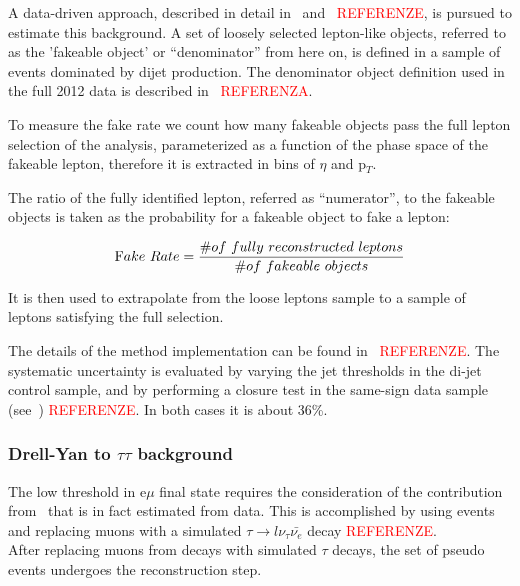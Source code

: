 A data-driven approach, described in detail in~\cite{AN-2010-261} and~\cite{AN-2010-397} \textcolor{red}{REFERENZE}, is pursued 
to estimate this background. A set of loosely selected lepton-like objects, referred to as the 
'fakeable object' or ``denominator'' from here on, is defined in a sample of events 
dominated by dijet production. The denominator object definition used in the full 2012
data is described in~\cite{AN-2012-378} \textcolor{red}{REFERENZA}.

To measure the fake rate we count how many fakeable objects pass the full lepton selection 
of the analysis, parameterized as a function of the phase space of the fakeable lepton, therefore 
it is extracted in bins of $\eta$ and p$_T$.


The ratio of the fully identified lepton, referred as ``numerator'', to the 
fakeable objects is taken as the probability for a fakeable object to fake a lepton:

\begin{equation} 
{\mbox Fake\ Rate } = \frac{\# of \ fully \ reconstructed \ leptons}{\# of \ fakeable \ objects} 
\end{equation}

It is then used to extrapolate from the loose leptons sample to a sample of leptons satisfying the  
full selection. 

The details of the method implementation can be found in~\cite{AN-2013-022} \textcolor{red}{REFERENZE}.
The systematic uncertainty is evaluated by varying the jet thresholds in the di-jet control sample, and by
performing a closure test in the same-sign data sample (see~\cite{AN-2013-022}) \textcolor{red}{REFERENZE}. In both cases it is about 36\%.

	\subsubsection{Drell-Yan to \texorpdfstring{$\tau\tau$}{tau tau} background\label{sec:DYtautaubkg}}


The low \MET threshold in e$\mu$ final state
requires the consideration of the contribution from 
\dytt\, that is in fact estimated from data.
This is accomplished by using 
\dymm events and replacing muons with a simulated
$\tau\to l\nu_\tau\bar{\nu_e}$ decay \cite{AN-2011-020} \textcolor{red}{REFERENZE}.\\
After replacing muons from \dymm decays with simulated $\tau$ decays,
the set of pseudo \dytt events undergoes the reconstruction step.
 
